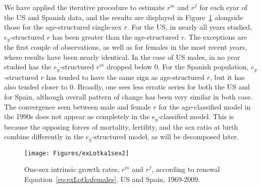   \FloatBarrier
  \label{sec:trendsinrex1sex}
 We have applied the iterative procedure to estimate $r^m$ and $r^f$ for each
 eyar of the US and Spanish data, and the results are displayed in
  Figure~\ref{fig:rex1sex} alongside those for the age-structured single-sex
  $r$. For the US, in nearly all years studied, $e_y$-structured $r$ has been
  greater than the age-structured $r$. The exceptions are the first couple of
  observations, as well as for females in the most recent years, where results
  have been nearly identical. In the case of US males, in no year studied has the $e_y$-structured
  $r^m$ dropped below 0. For the Spanish population,  $e_y$-structured $r$
  has tended to have the same sign as age-structured $r$, but it has also
  tended closer to 0. Broadly, one sees less erratic series for both the US and
  for Spain, although overall pattern of change has been very similar in both
  case. The convergence seen between male and female $r$ for the age-classified 
  model in the 1990s does not appear as completely in the $e_y$-classified
  model. This is because the opposing forces of mortality, fertility, and the sex ratio at birth 
  combine differently in the $e_y$-structured model, as will be decomposed later.

\begin{figure}[!ht]
  \centering
    \caption{One-sex intrinsic growth rates, $r^m$ and $r^f$, according to
    renewal Equation~\eqref{eq:exLotkafemales}, US and Spain, 1969-2009.}
     \texttt{[image: Figures/exLotka1sex2]}
     \label{fig:rex1sex}
\end{figure}




 \FloatBarrier
